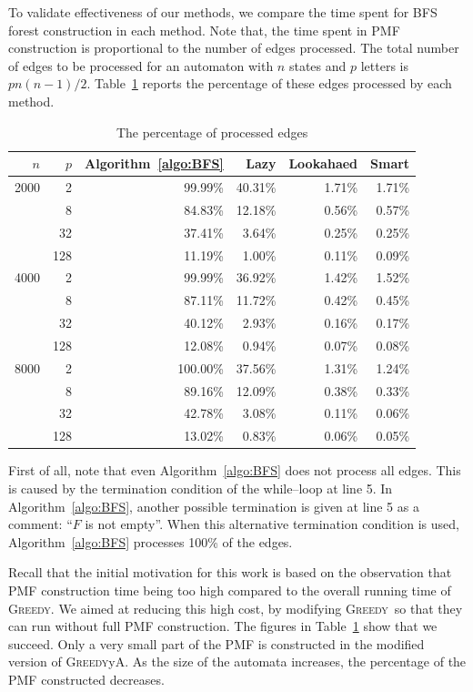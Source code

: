 \documentclass[12pt]{article}
\newcommand{\greedyAlgo}{\textsc{Greedy}}
\begin{document}
To validate effectiveness of our methods, we compare the time spent for BFS forest construction in each method. Note that, the time spent in PMF construction is proportional to the number of edges processed. The total number of edges to be processed for an automaton with $n$ states and $p$ letters is $pn(n-1)/2$. Table~\ref{table:edge-percent} reports the percentage of these edges processed by each method.

\begin{table}[ht]
	\center
	\begin{tabular}{rr||r||rrr}
$n$		&	$p$	& Algorithm~\ref{algo:BFS} 	& Lazy		& Lookahaed & Smart \\\hline\hline
2000	& 2		& 99.99\%					& 40.31\%	& 1.71\%	& 1.71\%\\
		& 8		& 84.83\%					& 12.18\%	& 0.56\%	& 0.57\%\\
		& 32	& 37.41\%					& 3.64\%	& 0.25\%	& 0.25\%\\
		& 128	& 11.19\%					& 1.00\%	& 0.11\%	& 0.09\%\\\hline
4000	& 2		& 99.99\%					& 36.92\%	& 1.42\%	& 1.52\%\\
		& 8		& 87.11\%					& 11.72\%	& 0.42\%	& 0.45\%\\
		& 32	& 40.12\%					& 2.93\%	& 0.16\%	& 0.17\%\\
		& 128	& 12.08\%					& 0.94\%	& 0.07\%	& 0.08\%\\\hline
8000	& 2		& 100.00\%					& 37.56\%	& 1.31\%	& 1.24\%\\
		& 8		& 89.16\%					& 12.09\%	& 0.38\%	& 0.33\%\\
		& 32	& 42.78\%					& 3.08\%	& 0.11\%	& 0.06\%\\
		& 128	& 13.02\%					& 0.83\%	& 0.06\%	& 0.05\%
	\end{tabular}
	\caption{The percentage of processed edges}
	\label{table:edge-percent}
\end{table}
First of all, note that even Algorithm~\ref{algo:BFS} does not process all edges. This is caused by the termination condition of the while--loop at line 5. In Algorithm~\ref{algo:BFS}, another possible termination is given at line 5 as a comment: ``$F$ is not empty''. When this alternative termination condition is used, Algorithm~\ref{algo:BFS} processes 100\% of the edges. 

Recall that the initial motivation for this work is based on the observation that PMF construction time being too high compared to the overall running time of \greedyAlgo . We aimed at reducing this high cost, by modifying \greedyAlgo\ so that they can run without full PMF construction. The figures in Table~\ref{table:edge-percent} show that we succeed. Only a very small part of the PMF is constructed in the modified version of \greedyAlgo yA. As the size of the automata increases, the percentage of the PMF constructed decreases.
\end{document}
